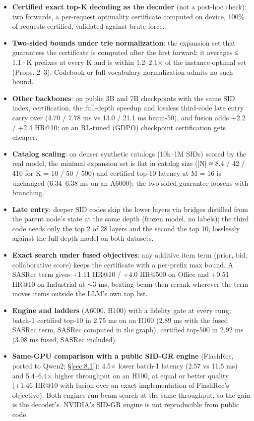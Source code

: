 \documentclass[11pt]{article}
\begin{document}
\begin{itemize}
\item \textbf{Certified exact top-K decoding as the decoder} (not a post-hoc check): two forwards, a per-request optimality certificate computed on device, 100\% of requests certified, validated against brute force.
\item \textbf{Two-sided bounds under trie normalization}: the expansion set that guarantees the certificate is computed after the first forward; it averages ≤ 1.1·K prefixes at every K and is within 1.2–2.1× of the instance-optimal set (Props. 2–3). Codebook or full-vocabulary normalization admits no such bound.
\item \textbf{Other backbones}: on public 3B and 7B checkpoints with the same SID index, certification, the full-depth speedup and lossless third-code late entry carry over (4.70 / 7.78 ms vs 13.0 / 21.1 ms beam-50), and fusion adds +2.2 / +2.4 HR@10; on an RL-tuned (GDPO) checkpoint certification gets cheaper.
\item \textbf{Catalog scaling}: on denser synthetic catalogs (10k–1M SIDs) scored by the real model, the minimal expansion set is flat in catalog size (|N| ≈ 8.4 / 42 / 410 for K = 10 / 50 / 500) and certified top-10 latency at M = 16 is unchanged (6.34–6.38 ms on an A6000); the two-sided guarantee loosens with branching.
\item \textbf{Late entry}: deeper SID codes skip the lower layers via bridges distilled from the parent node's state at the same depth (frozen model, no labels); the third code needs only the top 2 of 28 layers and the second the top 10, losslessly against the full-depth model on both datasets.
\item \textbf{Exact search under fused objectives}: any additive item term (prior, bid, collaborative score) keeps the certificate with a per-prefix max bound. A SASRec term gives +1.11 HR@10 / +4.0 HR@500 on Office and +0.51 HR@10 on Industrial at \ensuremath{\sim}3 ms, beating beam-then-rerank wherever the term moves items outside the LLM's own top list.
\item \textbf{Engine and ladders} (A6000, H100) with a fidelity gate at every rung; batch-1 certified top-10 in 2.75 ms on an H100 (2.89 ms with the fused SASRec term, SASRec computed in the graph), certified top-500 in 2.92 ms (3.08 ms fused, SASRec included).
\item \textbf{Same-GPU comparison with a public SID-GR engine} (FlashRec, ported to Qwen2; \S\ref{sec:8.1}): 4.5× lower batch-1 latency (2.57 vs 11.5 ms) and 5.4–6.4× higher throughput on an H100, at equal or better quality (+1.46 HR@10 with fusion over an exact implementation of FlashRec's objective). Both engines run beam search at the same throughput, so the gain is the decoder's. NVIDIA's SID-GR engine is not reproducible from public code.

\end{itemize}
\end{document}
